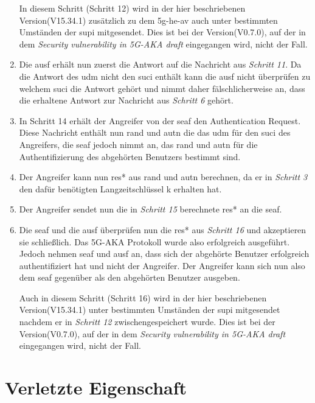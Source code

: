 \begin{enumerate}
In diesem Schritt (Schritt 12) wird in der hier beschriebenen Version(V15.34.1) zusätzlich zu dem \gls{5g-he-av} auch unter bestimmten Umständen der \gls{supi} mitgesendet.
Dies ist bei der Version(V0.7.0), auf der in dem \textit{Security vulnerability in 5G-AKA draft} eingegangen wird, nicht der Fall.

\item Die \gls{ausf} erhält nun zuerst die Antwort auf die Nachricht aus \textit{Schritt 11}.
Da die Antwort des \gls{udm} nicht den \gls{suci} enthält kann die \gls{ausf} nicht überprüfen zu welchem \gls{suci} die Antwort gehört und nimmt daher fälschlicherweise an, dass die erhaltene Antwort zur Nachricht aus \textit{Schritt 6} gehört.

\item In Schritt 14 erhält der Angreifer von der \gls{seaf} den Authentication Request.
Diese Nachricht enthält nun \gls{rand} und \gls{autn} die das \gls{udm} für den \gls{suci} des Angreifers, die \gls{seaf} jedoch nimmt an, das \gls{rand} und \gls{autn} für die Authentifizierung des abgehörten Benutzers bestimmt sind.

\item Der Angreifer kann nun \gls{res*} aus \gls{rand} und \gls{autn} berechnen, da er in \textit{Schritt 3} den dafür benötigten Langzeitschlüssel \gls{k} erhalten hat.

\item Der Angreifer sendet nun die in \textit{Schritt 15} berechnete \gls{res*} an die \gls{seaf}.

\item Die \gls{seaf} und die \gls{ausf} überprüfen nun die \gls{res*} aus \textit{Schritt 16} und akzeptieren sie schließlich.
Das 5G-AKA Protokoll wurde also erfolgreich ausgeführt.
Jedoch nehmen \gls{seaf} und \gls{ausf} an, dass sich der abgehörte Benutzer erfolgreich authentifiziert hat und nicht der Angreifer.
Der Angreifer kann sich nun also dem \gls{seaf} gegenüber als den abgehörten Benutzer ausgeben.

Auch in diesem Schritt (Schritt 16) wird in der hier beschriebenen Version(V15.34.1) unter bestimmten Umständen der \gls{supi} mitgesendet nachdem er in \textit{Schritt 12} zwischengespeichert wurde.
Dies ist bei der Version(V0.7.0), auf der in dem \textit{Security vulnerability in 5G-AKA draft} eingegangen wird, nicht der Fall.


\end{enumerate}


\section{Verletzte Eigenschaft}

